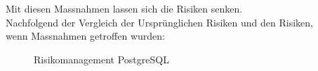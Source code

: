 \begin{flushleft}
\clearpage
{}
\recalctypearea
    Mit diesen Massnahmen lassen sich die Risiken senken.\\
    Nachfolgend der Vergleich der Ursprünglichen Risiken und den Risiken,\\
    wenn Massnahmen getroffen wurden:
    \begin{figure}[H]
        \centering
        \qquad
        \caption{Risikomanagement PostgreSQL}
        \label{fig:riskmanagement_postgresql}
    \end{figure}
\end{flushleft}
\clearpage
{}
\recalctypearea